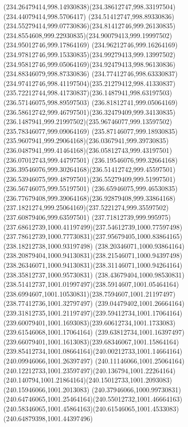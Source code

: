 {{	\curveto(234.26479414,998.14930838)(234.38612747,998.33197504)(234.44079414,998.5706417)
	\curveto(234.51412747,998.89330836)(234.55279414,999.07730836)(234.81412746,999.26130835)
	\curveto(234.8554608,999.22930835)(234.90079413,999.19997502)(234.95012746,999.17864169)
	\curveto(234.96212746,999.16264169)(234.97812746,999.15330835)(234.99279413,999.13997502)
	\curveto(234.95812746,999.05064169)(234.92479413,998.96130836)(234.88346079,998.87330836)
	\curveto(234.77412746,998.63330837)(234.97412746,998.41197504)(235.21279412,998.41330837)
	\curveto(235.72212744,998.41730837)(236.1487941,998.63197503)(236.57146075,998.89597503)
	\curveto(236.81812741,999.05064169)(236.58612742,999.46797501)(236.32479409,999.34130835)
	\curveto(236.1487941,999.21997502)(235.96746077,999.13597502)(235.78346077,999.09064169)
	\curveto(235.87146077,999.18930835)(235.9607941,999.29064168)(236.0367941,999.39730835)
	\curveto(236.0487941,999.41464168)(236.05812743,999.43197501)(236.07012743,999.44797501)
	\curveto(236.19546076,999.32664168)(236.39546076,999.30264168)(236.51412742,999.45597501)
	\curveto(236.53946075,999.48797501)(236.55279409,999.51997501)(236.56746075,999.55197501)
	\curveto(236.65946075,999.46530835)(236.77679408,999.39064168)(236.92879408,999.33864168)
	\curveto(237.1821274,999.25064169)(237.5221274,999.35597502)(237.60879406,999.63597501)
	\curveto(237.71812739,999.995975)(237.68612739,1000.41197499)(237.54612739,1000.77597498)
	\curveto(237.78612739,1000.77730831)(237.95679405,1000.83864165)(238.18212738,1000.93197498)
	\curveto(238.20346071,1000.93864164)(238.20879404,1000.94130831)(238.21546071,1000.94397498)
	\curveto(238.26346071,1000.94130831)(238.31146071,1000.94264164)(238.35812737,1000.95730831)
	\curveto(238.43679404,1000.98530831)(238.51412737,1001.01997497)(238.5914607,1001.05464164)
	\curveto(238.6994607,1001.10530831)(238.7594607,1001.21197497)(238.77412736,1001.32797497)
	\curveto(239.04479402,1001.26664164)(239.31812735,1001.21197497)(239.59412734,1001.17064164)
	\curveto(239.60079401,1001.1693083)(239.60612734,1001.1733083)(239.61546068,1001.17064164)
	\curveto(239.63812734,1001.16397497)(239.66079401,1001.1613083)(239.68346067,1001.15864164)
	\curveto(239.85412734,1001.08664164)(240.00212733,1001.14664164)(240.09946066,1001.26397497)
	\curveto(240.11146066,1001.25064164)(240.12212733,1001.23597497)(240.136794,1001.22264164)
	\curveto(240.140794,1001.21864164)(240.15012733,1001.2093083)(240.15946066,1001.2013083)
	\curveto(240.37946066,1000.99730831)(240.64746065,1001.25464164)(240.55012732,1001.46664163)
	\curveto(240.58346065,1001.45864163)(240.61546065,1001.4533083)(240.64879398,1001.44397496)
}}
